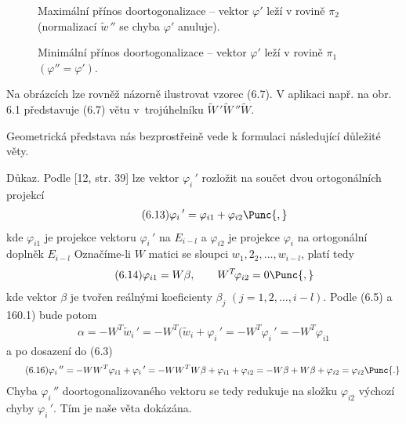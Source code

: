 \begin{figure}\centering

%
\label{6.2.}
\caption{Maximální přínos doortogonalizace -- vektor $\varphi'$ leží
  v rovině $\pi_2$ (normalizací $\widetilde w\,''$ se chyba
  $\varphi'$ anuluje).}
%
\end{figure}

\begin{figure}\centering

%
\label{6.3.}
\caption{Minimální přínos doortogonalizace -- vektor $\varphi'$ leží
v rovině $\pi_1$ $(\varphi'' = \varphi')$.}
%
\end{figure}

\noindent
Na obrázcích  lze rovněž názorně ilustrovat vzorec (6.7). V
aplikaci např. na obr. 6.1 představuje (6.7) 
větu v~trojúhelníku $\widetilde W\,' \widetilde W\,'' \widetilde W $.

Geometrická představa nás bezprostřeině vede k formulaci následující
důležité věty.


Důkaz. Podle [12, str. 39] lze vektor $\varphi_i\,'$ rozložit na součet
dvou ortogonálních projekcí
%
\begin{align*}
  \tag{6.13}
  \varphi_i\,' = \varphi_{i1} + \varphi_{i2} \Punc{,}
\end{align*}
%
kde $\varphi_{i1}$ je projekce vektoru $\varphi_i\,'$
na $E_{i-l}$ a $\varphi_{i2}$ je projekce  $\varphi_i$
na ortogonální doplněk $E_{i-l}$ Označíme-li $W$ matici se sloupci
$w_1,2_2,\dots,w_{i-l}$, platí tedy
%
\begin{align*}
  \tag{6.14}
  \varphi_{i1} = W\beta, \qquad W^T\!\varphi_{i2} = 0 \Punc{,}
\end{align*}
%
kde  vektor $\beta$ je tvořen reálnými koeficienty $\beta_j$
$(j=1,2,\dots,i-l)$.  Podle (6.5) a 160.1) bude potom
%
\begin{align*}
  \tag{6.15}
  \alpha = - W^T\widetilde w_i\,'
  = -W^T(\widetilde w_i + \varphi_i\,'
  = -W^T\varphi_i\,' = -W^T\varphi_{i1}
\end{align*}
%
a po dosazení do (6.3)
%
\begin{align*}
  \tag{6.16}
  \varphi_i\,'' = -WW^T \varphi_{i1} + \varphi_i\,'
  = - WW^TW\beta + \varphi_{i1} + \varphi_{i2}
  = -W\beta + W\beta + \varphi_{i2} = \varphi_{i2} \Punc{.}
\end{align*}
%
Chyba $\varphi_i\,''$ doortogonalizovaného vektoru se tedy redukuje na
složku $\varphi_{i2}$ výchozí chyby $\varphi_i\,'$. Tím je naše věta
dokázána.

